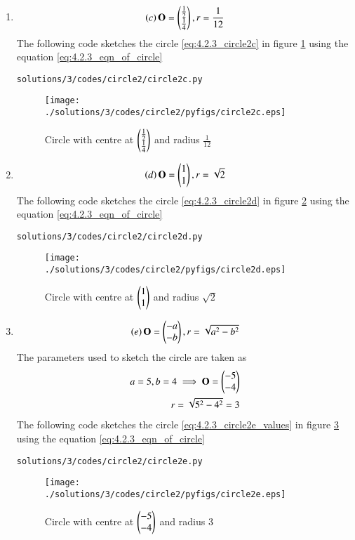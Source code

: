 \begin{enumerate}
\item
\begin{align}
\left(c\right)\mathbf{O}=\begin{pmatrix}\frac{1}{2}\\\frac{1}{4}\end{pmatrix}, r=\frac{1}{12}
\label{eq:4.2.3_circle2c}
\end{align}
The following code sketches the circle \eqref{eq:4.2.3_circle2c} in figure \ref{fig:4.2.3_circle2c} using the equation \eqref{eq:4.2.3_eqn_of_circle}
\begin{lstlisting}
solutions/3/codes/circle2/circle2c.py
\end{lstlisting}
\begin{figure}[!ht]
\centering
\texttt{[image: ./solutions/3/codes/circle2/pyfigs/circle2c.eps]}
\caption{Circle with centre at $\begin{pmatrix}\frac{1}{2}\\\frac{1}{4}\end{pmatrix}$ and radius $\frac{1}{12}$}
\label{fig:4.2.3_circle2c}
\end{figure}


\item
\begin{align}
\left(d\right)\mathbf{O}=\begin{pmatrix}1\\1\end{pmatrix}, r=\sqrt{2}
\label{eq:4.2.3_circle2d}
\end{align}
The following code sketches the circle \eqref{eq:4.2.3_circle2d} in figure \ref{fig:4.2.3_circle2d} using the equation \eqref{eq:4.2.3_eqn_of_circle}
\begin{lstlisting}
solutions/3/codes/circle2/circle2d.py
\end{lstlisting}
\begin{figure}[!ht]
\centering
\texttt{[image: ./solutions/3/codes/circle2/pyfigs/circle2d.eps]}
\caption{Circle with centre at $\begin{pmatrix}1\\1\end{pmatrix}$ and radius $\sqrt{2}$}
\label{fig:4.2.3_circle2d}
\end{figure}

\item
\begin{align}
\left(e\right)\mathbf{O}=\begin{pmatrix}-a\\-b\end{pmatrix}, r=\sqrt{a^2-b^2}
\label{eq:4.2.3_circle2e}
\end{align}
The parameters used to sketch the circle are taken as 
\begin{align}
a=5,b=4
\implies \mathbf{O}=\begin{pmatrix}-5\\-4\end{pmatrix}
\\
r=\sqrt{5^2-4^2}=3
\label{eq:4.2.3_circle2e_values}
\end{align}
The following code sketches the circle \eqref{eq:4.2.3_circle2e_values} in figure \ref{fig:4.2.3_circle2e} using the equation \eqref{eq:4.2.3_eqn_of_circle}
\begin{lstlisting}
solutions/3/codes/circle2/circle2e.py
\end{lstlisting}
\begin{figure}[!ht]
\centering
\texttt{[image: ./solutions/3/codes/circle2/pyfigs/circle2e.eps]}
\caption{Circle with centre at $\begin{pmatrix}-5\\-4\end{pmatrix}$ and radius $3$}
\label{fig:4.2.3_circle2e}
\end{figure}



\end{enumerate}
